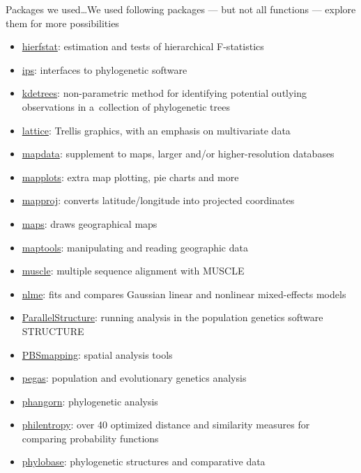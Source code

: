 \documentclass[compress, ucs, xelatex, 11pt, xcolor=svgnames, aspectratio=169,
	hyperref={
		bookmarks=true,
		unicode=true,
		colorlinks=true,
		pdftitle={Molecular data in R},
		plainpages=false,
		pdfauthor={Vojtech Zeisek},
		pdfsubject={Course about phylogeny and evolution in R},
		pdfcreator={XeLaTeX},
		pdfkeywords={R, evolution, phylogeny, molecular data},
		linkcolor=Crimson, %
		anchorcolor=Magenta, %
		citecolor=Magenta, %
		filecolor=Magenta, %
		menucolor=Magenta, %
		urlcolor=DodgerBlue, %
		pdftex},
	url={hyphens, lowtilde} %
	]{beamer}
\begin{document}
\begin{frame}[allowframebreaks]{Packages we used\ldots}{We used following packages --- but not all functions --- explore them for more possibilities}
\begin{itemize}
		\item \href{https://CRAN.R-project.org/package=hierfstat}{hierfstat}: estimation and tests of hierarchical F-statistics
		\item \href{https://CRAN.R-project.org/package=ips}{ips}: interfaces to phylogenetic software
		\item \href{https://CRAN.R-project.org/package=kdetrees}{kdetrees}: non-parametric method for identifying potential outlying observations in a~collection of phylogenetic trees
		\item \href{https://CRAN.R-project.org/package=lattice}{lattice}: Trellis graphics, with an emphasis on multivariate data
		\item \href{https://CRAN.R-project.org/package=mapdata}{mapdata}: supplement to maps, larger and/or higher-resolution databases
		\item \href{https://CRAN.R-project.org/package=mapplots}{mapplots}: extra map plotting, pie charts and more
		\item \href{https://CRAN.R-project.org/package=mapproj}{mapproj}: converts latitude/longitude into projected coordinates
		\item \href{https://CRAN.R-project.org/package=maps}{maps}: draws geographical maps
		\item \href{https://CRAN.R-project.org/package=maptools}{maptools}: manipulating and reading geographic data
		\item \href{https://bioconductor.org/packages/release/bioc/html/muscle.html}{muscle}: multiple sequence alignment with MUSCLE
		\item \href{https://CRAN.R-project.org/package=nlme}{nlme}: fits and compares Gaussian linear and nonlinear mixed-effects models
		\item \href{https://r-forge.r-project.org/projects/parallstructure/}{ParallelStructure}: running analysis in the population genetics software STRUCTURE
		\item \href{https://CRAN.R-project.org/package=PBSmapping}{PBSmapping}: spatial analysis tools
		\item \href{https://CRAN.R-project.org/package=pegas}{pegas}: population and evolutionary genetics analysis
		\item \href{https://CRAN.R-project.org/package=phangorn}{phangorn}: phylogenetic analysis
		\item \href{https://CRAN.R-project.org/package=philentropy}{philentropy}: over 40 optimized distance and similarity measures for comparing probability functions
		\item \href{https://CRAN.R-project.org/package=phylobase}{phylobase}: phylogenetic structures and comparative data

\end{itemize}
\end{frame}
\end{document}
